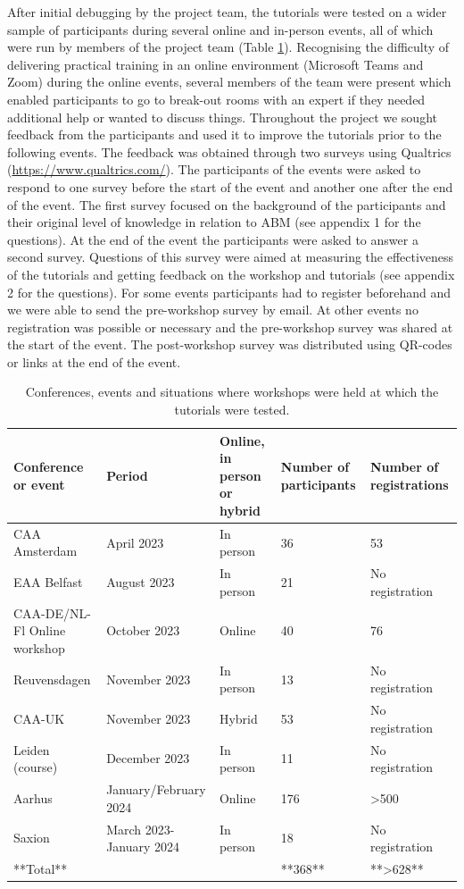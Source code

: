 \documentclass[
]{article}
\begin{document}
After initial debugging by the project team, the tutorials were tested on a wider sample of participants during several online and in-person events, all of which were run by members of the project team (Table \ref{tab:events}). Recognising the difficulty of delivering practical training in an online environment (Microsoft Teams and Zoom) during the online events, several members of the team were present which enabled participants to go to break-out rooms with an expert if they needed additional help or wanted to discuss things. Throughout the project we sought feedback from the participants and used it to improve the tutorials prior to the following events. The feedback was obtained through two surveys using Qualtrics (\url{https://www.qualtrics.com/}). The participants of the events were asked to respond to one survey before the start of the event and another one after the end of the event. The first survey focused on the background of the participants and their original level of knowledge in relation to ABM (see appendix 1 for the questions). At the end of the event the participants were asked to answer a second survey. Questions of this survey were aimed at measuring the effectiveness of the tutorials and getting feedback on the workshop and tutorials (see appendix 2 for the questions). For some events participants had to register beforehand and we were able to send the pre-workshop survey by email. At other events no registration was possible or necessary and the pre-workshop survey was shared at the start of the event. The post-workshop survey was distributed using QR-codes or links at the end of the event.

\begin{table}

\caption{\label{tab:events}Conferences, events and situations where workshops were held at which the tutorials were tested.}
\centering
\begin{tabular}[t]{l|l|l|l|l}
\hline
Conference or event & Period & Online, in person or hybrid & Number of participants & Number of registrations\\
\hline
CAA Amsterdam & April 2023 & In person & 36 & 53\\
\hline
EAA Belfast & August 2023 & In person & 21 & No registration\\
\hline
CAA-DE/NL-Fl Online workshop & October 2023 & Online & 40 & 76\\
\hline
Reuvensdagen & November 2023 & In person & 13 & No registration\\
\hline
CAA-UK & November 2023 & Hybrid & 53 & No registration\\
\hline
Leiden (course) & December 2023 & In person & 11 & No registration\\
\hline
Aarhus & January/February 2024 & Online & 176 & >500\\
\hline
Saxion & March 2023-January 2024 & In person & 18 & No registration\\
\hline
**Total** &  &  & **368** & **>628**\\
\hline
\end{tabular}
\end{table}
\end{document}
